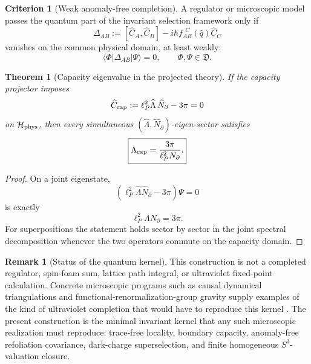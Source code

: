 \documentclass[aps,prd,reprint,nofootinbib,superscriptaddress,floatfix]{revtex4-2}
\numberwithin{equation}{section}
\theoremstyle{definition}
\newtheorem{criterion}{Criterion}[section]
\newtheorem{remark}{Remark}[section]
\theoremstyle{plain}
\newtheorem{theorem}{Theorem}[section]
\newcommand{\Hphys}{\mathcal H_{\rm phys}}
\begin{document}
\begin{criterion}[Weak anomaly-free completion]\label{crit:weak-anomaly}
A regulator or microscopic model passes the quantum part of the invariant selection framework only if
\begin{equation}
\Delta_{AB}
:=
[\widehat C_A,\widehat C_B]
-i\hbar f_{AB}^{\ \ C}(\widehat q)\widehat C_C
\end{equation}
vanishes on the common physical domain, at least weakly:
\begin{equation}
\langle\Phi|\Delta_{AB}|\Psi\rangle=0,
\qquad
\Phi,\Psi\in\mathfrak D.
\end{equation}
\end{criterion}

\begin{theorem}[Capacity eigenvalue in the projected theory]\label{thm:capacity-eigenvalue-quantum}
If the capacity projector imposes
\begin{equation}
\widehat C_{\rm cap}:=\ell_P^2\widehat\Lambda\,\widehat N_\partial-3\pi=0
\end{equation}
on \(\Hphys\), then every simultaneous \((\widehat\Lambda,\widehat N_\partial)\)-eigen-sector satisfies
\begin{equation}
\boxed{
\Lambda_{\rm cap}=\frac{3\pi}{\ell_P^2N_\partial}.
}
\end{equation}
\end{theorem}

\begin{proof}
On a joint eigenstate,
\[
(\ell_P^2\widehat\Lambda\widehat N_\partial-3\pi)\Psi=0
\]
is exactly
\[
\ell_P^2\Lambda N_\partial=3\pi.
\]
For superpositions the statement holds sector by sector in the joint spectral decomposition whenever the two operators commute on the capacity domain.
\end{proof}

\begin{remark}[Status of the quantum kernel]
This construction is not a completed regulator, spin-foam sum, lattice path integral, or ultraviolet fixed-point calculation.  Concrete microscopic programs such as causal dynamical triangulations and functional-renormalization-group gravity supply examples of the kind of ultraviolet completion that would have to reproduce this kernel \cite{Loll2020,Saueressig2023}.  The present construction is the minimal invariant kernel that any such microscopic realization must reproduce: trace-free locality, boundary capacity, anomaly-free refoliation covariance, dark-charge superselection, and finite homogeneous \(S^3\)-valuation closure.
\end{remark}
\end{document}
